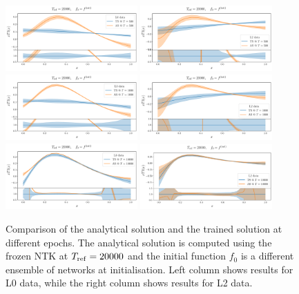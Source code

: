   \begin{figure}[ht!]
    \centering
    \includegraphics[width=0.45\textwidth]{plots/analytical_solution/evolution_vs_trained_epoch_500_L0.pdf} \hspace{10mm}
    \includegraphics[width=0.45\textwidth]{plots/analytical_solution/evolution_vs_trained_epoch_500_L2.pdf}
    \includegraphics[width=0.45\textwidth]{plots/analytical_solution/evolution_vs_trained_epoch_1000_L0.pdf} \hspace{10mm}
    \includegraphics[width=0.45\textwidth]{plots/analytical_solution/evolution_vs_trained_epoch_1000_L2.pdf}
    \includegraphics[width=0.45\textwidth]{plots/analytical_solution/evolution_vs_trained_epoch_10000_L0.pdf} \hspace{10mm}
    \includegraphics[width=0.45\textwidth]{plots/analytical_solution/evolution_vs_trained_epoch_10000_L2.pdf}
    \caption{Comparison of the analytical solution and the trained solution at
    different epochs. The analytical solution is computed using the frozen NTK
    at $T_{\rm ref} = 20000$ and the initial function $f_0$ is a different
    ensemble of networks at initialisation. Left column shows results for L0
    data, while the right column shows results for L2 data.}
    \label{fig:xT3_analytical_vs_trained}
  \end{figure}
